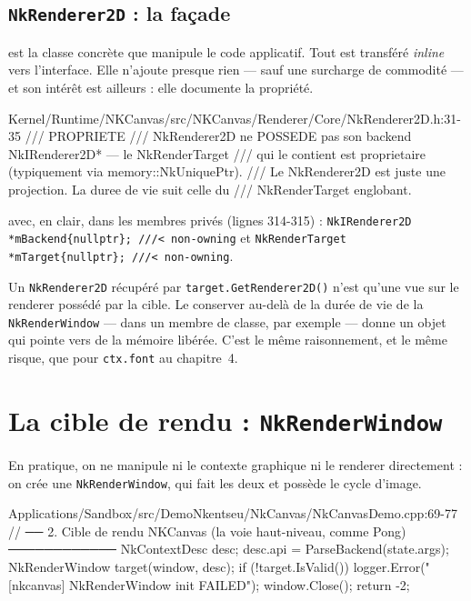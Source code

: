 \subsection{\texttt{NkRenderer2D} : la façade}

 est la classe concrète que manipule
le code applicatif. Tout est transféré \emph{inline} vers l'interface. Elle
n'ajoute presque rien — sauf une surcharge de commodité — et son intérêt est
ailleurs : elle documente la propriété.

\begin{nkcode}{Kernel/Runtime/NKCanvas/src/NKCanvas/Renderer/Core/NkRenderer2D.h:31-35}
/// PROPRIETE
///   NkRenderer2D ne POSSEDE pas son backend NkIRenderer2D* — le NkRenderTarget
///   qui le contient est proprietaire (typiquement via memory::NkUniquePtr).
///   Le NkRenderer2D est juste une projection. La duree de vie suit celle du
///   NkRenderTarget englobant.
\end{nkcode}

\noindent avec, en clair, dans les membres privés (lignes 314-315) :
\texttt{NkIRenderer2D *mBackend\{nullptr\}; ///< non-owning} et
\texttt{NkRenderTarget *mTarget\{nullptr\}; ///< non-owning}.

\begin{nkpiege}
Un \texttt{NkRenderer2D} récupéré par \texttt{target.GetRenderer2D()} n'est
qu'une vue sur le renderer possédé par la cible. Le conserver au-delà de la
durée de vie de la \texttt{NkRenderWindow} — dans un membre de classe, par
exemple — donne un objet qui pointe vers de la mémoire libérée. C'est le même
raisonnement, et le même risque, que pour \texttt{ctx.font} au chapitre~4.
\end{nkpiege}

\section{La cible de rendu : \texttt{NkRenderWindow}}

En pratique, on ne manipule ni le contexte graphique ni le renderer directement :
on crée une \texttt{NkRenderWindow}, qui fait les deux et possède le cycle
d'image.

\begin{nkcode}{Applications/Sandbox/src/DemoNkentseu/NkCanvas/NkCanvasDemo.cpp:69-77}
    // ── 2. Cible de rendu NKCanvas (la voie haut-niveau, comme Pong) ────────────
    NkContextDesc desc;
    desc.api = ParseBackend(state.args);
    NkRenderWindow target(window, desc);
    if (!target.IsValid()) {
        logger.Error("[nkcanvas] NkRenderWindow init FAILED");
        window.Close();
        return -2;
    }
\end{nkcode}

